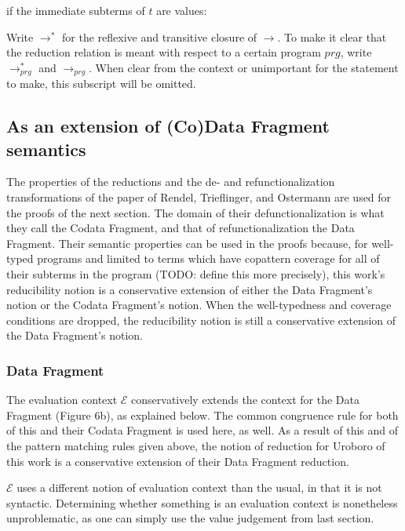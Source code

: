 \documentclass[11pt]{article} %
\begin{document}
if the immediate subterms of $t$ are values:
\begin{prooftree}
\end{prooftree}

Write $\longrightarrow^*$ for the reflexive and transitive closure of $\longrightarrow$. To make it clear that the reduction relation is meant with respect to a certain program $prg$, write $\longrightarrow^*_{prg}$ and $\longrightarrow_{prg}$. When clear from the context or unimportant for the statement to make, this subscript will be omitted.

\subsection{As an extension of (Co)Data Fragment semantics}

The properties of the reductions and the de- and refunctionalization transformations of the paper of Rendel, Trieflinger, and Ostermann are used for the proofs of the next section. The domain of their defunctionalization is what they call the Codata Fragment, and that of refunctionalization the Data Fragment. Their semantic properties can be used in the proofs because, for well-typed programs and limited to terms which have copattern coverage for all of their subterms in the program (TODO: define this more precisely), this work's reducibility notion is a conservative extension of either the Data Fragment's notion or the Codata Fragment's notion. When the well-typedness and coverage conditions are dropped, the reducibility notion is still a conservative extension of the Data Fragment's notion.

\subsubsection{Data Fragment}

The evaluation context $\mathcal{E}$ conservatively extends the context for the Data Fragment (Figure 6b), as explained below. The common congruence rule for both of this and their Codata Fragment is used here, as well. As a result of this and of the pattern matching rules given above, the notion of reduction for Uroboro of this work is a conservative extension of their Data Fragment reduction.

$\mathcal{E}$ uses a different notion of evaluation context than the usual, in that it is not syntactic. Determining whether something is an evaluation context is nonetheless unproblematic, as one can simply use the value judgement from last section.
\end{document}
